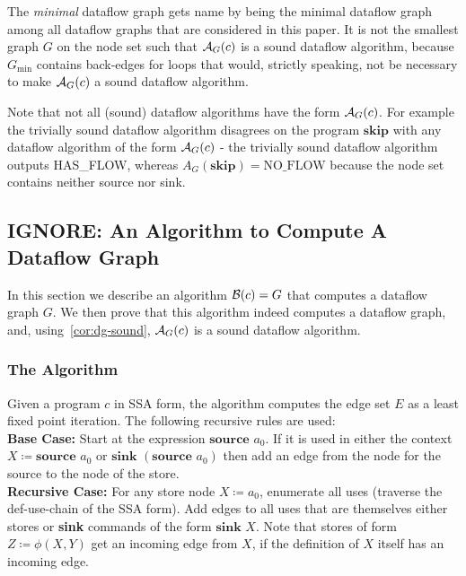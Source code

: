 \begin{remark}
    The \emph{minimal} dataflow graph gets name by being the minimal dataflow graph
    among all dataflow graphs that are considered in this paper.
    It is not the smallest graph $G$ on the node set 
    such that $\operatorname{\mathcal{A}}_G(c)$ is a sound dataflow algorithm,
    because $G_\text{min}$ contains back-edges for loops that would, strictly
    speaking, not be necessary to make $\operatorname{\mathcal{A}}_G(c)$ a sound dataflow algorithm.
\end{remark}

\begin{remark}
    Note that not all (sound) dataflow algorithms have the form $\operatorname{\mathcal{A}}_G(c)$.
    For example the trivially sound dataflow algorithm disagrees on the 
    program $\textbf{skip}$ with any dataflow algorithm of the form 
    $\operatorname{\mathcal{A}}_G(c)$ - the trivially sound
    dataflow algorithm outputs HAS\_FLOW, whereas
    $A_G(\textbf{skip}) = \text{NO\_FLOW}$ because the node set contains
    neither source nor sink.
\end{remark}

\subsection{IGNORE: An Algorithm to Compute A Dataflow Graph}
In this section we describe an algorithm $\operatorname{\mathcal{B}}(c) = G$ that computes a dataflow 
graph $G$. We then prove that this algorithm indeed
computes a dataflow graph, and, using~\autoref{cor:dg-sound},
$\operatorname{\mathcal{A}}_G(c)$ is a sound dataflow algorithm.

\subsubsection*{The Algorithm}
Given a program $c$ in SSA form, the algorithm computes
the edge set $E$ as a least fixed point iteration.
The following recursive rules are used:\\
\textbf{Base Case:} Start at the expression $\textbf{source }a_0$.
If it is used in either the context $X \coloneqq \textbf{source }a_0$
or $\textbf{sink }(\textbf{source }a_0)$ then add an edge from the node for the
source to the node of the store.\\
\textbf{Recursive Case:} For any store node $X \coloneqq a_0$, enumerate all uses (traverse
the def-use-chain of the SSA form). Add edges to all uses that are themselves
either stores or \textbf{sink} commands of the form $\textbf{sink } X$.
Note that stores of form $Z \coloneqq \phi(X, Y)$ get an incoming edge from $X$,
if the definition of $X$ itself has an incoming edge.

